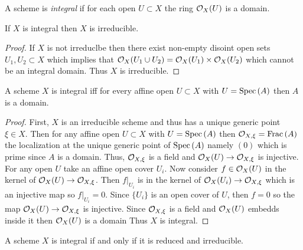 \documentclass[12pt]{article}
\begin{document}
\begin{definition}
A scheme is \textit{integral} if for each open $U \subset X$ the ring $\mathcal{O}_{X}(U)$ is a domain.
\end{definition}

\begin{lemma}
If $X$ is integral then $X$ is irreducible.
\end{lemma}

\begin{proof}
If $X$ is not irreduclbe then there exist non-empty disoint open sets $U_1, U_2 \subset X$ which implies that $\mathcal{O}_{X}(U_1 \cup U_2) = \mathcal{O}_{X}(U_1) \times \mathcal{O}_{X}(U_2)$ which cannot be an integral domain. Thus $X$ is irreducible.
\end{proof}

\begin{proposition}
A scheme $X$ is integral iff for every affine open $U \subset X$ with $U = \mathrm{Spec}\left( A \right)$ then $A$ is a domain. 
\end{proposition}

\begin{proof}
First, $X$ is an irreducible scheme and thus has a unique generic point $\xi \in X$. Then for any affine open $U \subset X$ with $U = \mathrm{Spec}\left( A \right)$ then $\mathcal{O}_{X, \xi} = \mathrm{Frac}\left(A\right)$ the localization at the unique generic point of $\mathrm{Spec}\left( A \right)$ namely $(0)$ which is prime since $A$ is a domain. Thus, $\mathcal{O}_{X, \xi}$ is a field and $\mathcal{O}_{X}(U) \to \mathcal{O}_{X, \xi}$ is injective. For any open $U$ take an affine open cover $U_i$. Now consider $f \in \mathcal{O}_{X}(U)$ in the kernel of $\mathcal{O}_{X}(U) \to \mathcal{O}_{X, \xi}$. Then $f|_{U_i}$ is in the kernel of $\mathcal{O}_{X}(U_i) \to \mathcal{O}_{X, \xi}$ which is an injective map so $f|_{U_i} = 0$. Since $\{ U_i \}$ is an open cover of $U$, then $f = 0$ so the map $\mathcal{O}_{X}(U) \to \mathcal{O}_{X, \xi}$ is injective. Since $\mathcal{O}_{X, \xi}$ is a field and $\mathcal{O}_{X}(U)$ embedds inside it then $\mathcal{O}_{X}(U)$ is a domain Thus $X$ is integral. 
\end{proof}


\begin{proposition}
A scheme $X$ is integral if and only if it is reduced and irreducible.
\end{proposition}
\end{document}
